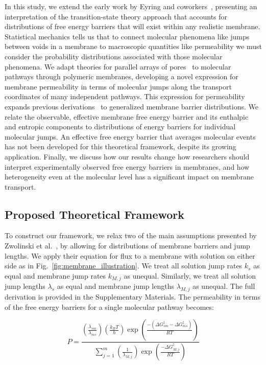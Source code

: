 \documentclass[12pt]{article}
\begin{document}
In this study, we extend the early work by Eyring and coworkers~\cite{zwolinski_diffusion_1949,giddings_multi-barrier_1958}, presenting an interpretation of the transition-state theory approach that accounts for distributions of free energy barriers that will exist within any realistic membrane. Statistical mechanics tells us that to connect molecular phenomena like jumps between voids in a membrane to macroscopic quantities like permeability we must consider the probability distributions associated with those molecular phenomena. We adapt theories for parallel arrays of pores~\cite{wendt_effect_1976,del_castillo_energy-barrier_1979} to molecular pathways through polymeric membranes, developing a novel expression for membrane permeability in terms of molecular jumps along the transport coordinates of many independent pathways. This expression for permeability expands previous derivations~\cite{zwolinski_diffusion_1949,giddings_multi-barrier_1958} to generalized membrane barrier distributions. We relate the observable, effective membrane free energy barrier and its enthalpic and entropic components to distributions of energy barriers for individual molecular jumps. An effective free energy barrier that averages molecular events has not been developed for this theoretical framework, despite its growing application. Finally, we discuss how our results change how researchers should interpret experimentally observed free energy barriers in membranes, and how heterogeneity even at the molecular level has a significant impact on membrane transport.

\subsection*{Proposed Theoretical Framework}

To construct our framework, we relax two of the main assumptions presented by Zwolinski et al.~\cite{zwolinski_diffusion_1949}, by allowing for distributions of membrane barriers and jump lengths. We apply their equation for flux to a membrane with solution on either side as in Fig.~\ref{fig:membrane_illustration}. We treat all solution jump rates $k_s$ as equal and membrane jump rates $k_{M,j}$ as unequal. Similarly, we treat all solution jump lengths $\lambda_{s}$ as equal and membrane jump lengths $\lambda_{M,j}$ as unequal. The full derivation is provided in the Supplementary Materials. The permeability in terms of the free energy barriers for a single molecular pathway becomes:

\begin{equation}
    P = \frac{\displaystyle \left( \frac{\lambda_{sm}}{\lambda_{ms}} \right) \left( \frac{k_B T}{h} \right) \exp{\left( \frac{ -\left( \Delta G_{sm}^{\ddagger} - \Delta G_{ms}^{\ddagger} \right)}{R T} \right)}}{\displaystyle \sum_{j=1}^m \left( \frac{1}{\lambda_{M,j}} \right) \exp{\left( \frac{-\Delta G_{M,j}^{\ddagger}}{R T} \right)}}
    \label{eq:permeability_barriers}
\end{equation}
\end{document}
